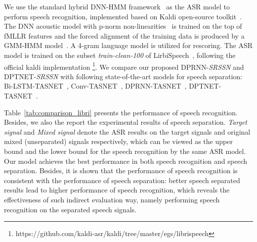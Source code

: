 We use the standard hybrid DNN-HMM framework~\cite{DNN-HMM} as the ASR model to perform speech recognition, implemented based on Kaldi open-source toolkit~\cite{kaldi}. The DNN acoustic model with p-norm non-linearities~\cite{pnorm} is trained on the top of fMLLR features and the forced alignment of the training data is produced by a GMM-HMM model~\cite{compact}. A 4-gram language model is utilized for rescoring. The ASR model is trained on the subset \textit{train-clean-100} of LirbiSpeech~\cite{librispeech}, following the official kaldi implementation \footnote[1]{https://github.com/kaldi-asr/kaldi/tree/master/egs/librispeech}. We compare our proposed DPRNN-\emph{SRSSN} and DPTNET-\emph{SRSSN} with following state-of-the-art models for speech separation: Bi-LSTM-TASNET~\cite{BLSTM-TasNet}, Conv-TASNET~\cite{Conv-tasnet}, DPRNN-TASNET~\cite{DPRNN}, DPTNET-TASNET~\cite{DPTNet}. 

Table~\ref{tab:comparison_libri} presents the performance of speech recognition. Besides, we also the report the experimental results of speech separation. \textit{Target signal} and \textit{Mixed signal} denote the ASR results on the target signals and original mixed (unseparated) signals respectively, which can be viewed as the upper bound and the lower bound for the speech recognition by the same ASR model. 
Our model achieves the best performance in both speech recognition and speech separation. Besides, it is shown that the performance of speech recognition is consistent with the performance of speech separation: better speech separated results lead to higher performance of speech recognition, which reveals the effectiveness of such indirect evaluation way, namely performing speech recognition on the separated speech signals.




